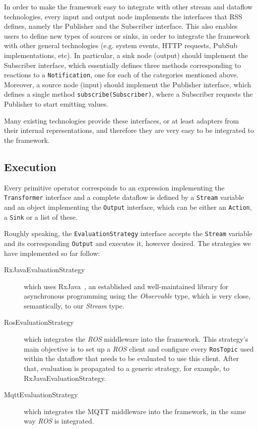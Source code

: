\documentclass[sigplan,screen]{acmart}
\begin{document}
In order to make the framework easy to integrate with other stream and
dataflow technologies, every input and output node implements the interfaces
that RSS defines, namely the Publisher and the Subscriber interface. This also
enables users to define new types of sources or sinks, in order to integrate
the framework with other general technologies (e.g. system events, HTTP requests,
PubSub implementations, etc).
%
In particular, a sink node (output) should implement the Subscriber interface, which
essentially defines three methods corresponding to reactions to a
\texttt{Notification}, one for each of the categories mentioned above.
%
Moreover, a source node (input) should implement the Publisher interface, which defines a
single method \texttt{subscribe(Subscriber)}, where a Subscriber requests the
Publisher to start emitting values.

Many existing technologies provide these interfaces, or at least adapters from
their internal representations, and therefore they are very easy to be
integrated to the framework.

\subsection{Execution}

Every primitive operator corresponds to an expression implementing the
\texttt{Transformer} interface and a complete dataflow is defined by a
\texttt{Stream} variable and an object implementing the \texttt{Output} interface,
which can be either an \texttt{Action}, a \texttt{Sink} or a list of these.

Roughly speaking, the \texttt{EvaluationStrategy} interface accepts the
\texttt{Stream} variable and its corresponding \texttt{Output} and executes it,
however desired. The strategies we have implemented so far follow:
\begin{description}
\item[RxJavaEvaluationStrategy]
which uses RxJava~, an established and well-maintained library for
asynchronous programming using the \textit{Observable} type, which is very close,
semantically, to our \textit{Stream} type.

\item[RosEvaluationStrategy] which integrates the \textit{ROS} middleware into the
framework. This strategy's main objective is to set up a \textit{ROS} client and
configure every \texttt{RosTopic} used within the dataflow that needs to be
evaluated to use this client. After that, evaluation is propagated to a generic
strategy, for example, to RxJavaEvaluationStrategy.

\item[MqttEvaluationStrategy] which integrates the MQTT middleware into the
framework, in the same way \textit{ROS} is integrated.

\end{description}
\end{document}
